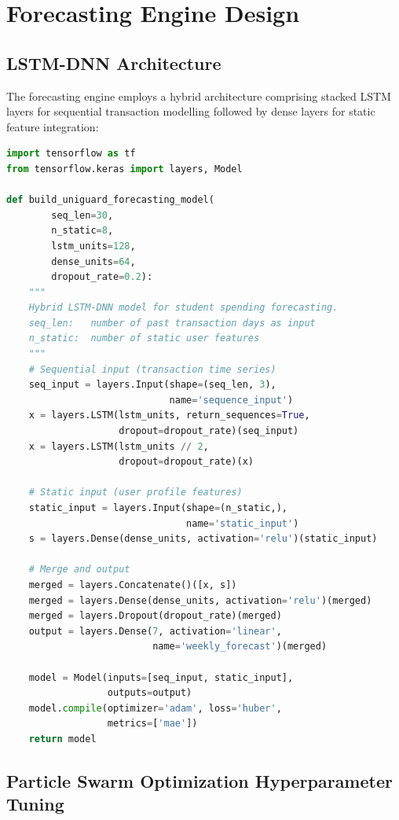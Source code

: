 \documentclass[12pt,a4paper]{report}
\begin{document}
\section{Forecasting Engine Design}

\subsection{LSTM-DNN Architecture}

The forecasting engine employs a hybrid architecture comprising stacked LSTM layers
for sequential transaction modelling followed by dense layers for static feature
integration:

\begin{lstlisting}[language=Python, caption={LSTM-DNN Forecasting Model Architecture}]
import tensorflow as tf
from tensorflow.keras import layers, Model

def build_uniguard_forecasting_model(
        seq_len=30,
        n_static=8,
        lstm_units=128,
        dense_units=64,
        dropout_rate=0.2):
    """
    Hybrid LSTM-DNN model for student spending forecasting.
    seq_len:   number of past transaction days as input
    n_static:  number of static user features
    """
    # Sequential input (transaction time series)
    seq_input = layers.Input(shape=(seq_len, 3),
                             name='sequence_input')
    x = layers.LSTM(lstm_units, return_sequences=True,
                    dropout=dropout_rate)(seq_input)
    x = layers.LSTM(lstm_units // 2,
                    dropout=dropout_rate)(x)

    # Static input (user profile features)
    static_input = layers.Input(shape=(n_static,),
                                name='static_input')
    s = layers.Dense(dense_units, activation='relu')(static_input)

    # Merge and output
    merged = layers.Concatenate()([x, s])
    merged = layers.Dense(dense_units, activation='relu')(merged)
    merged = layers.Dropout(dropout_rate)(merged)
    output = layers.Dense(7, activation='linear',
                          name='weekly_forecast')(merged)

    model = Model(inputs=[seq_input, static_input],
                  outputs=output)
    model.compile(optimizer='adam', loss='huber',
                  metrics=['mae'])
    return model
\end{lstlisting}

\subsection{Particle Swarm Optimization Hyperparameter Tuning}
\end{document}
